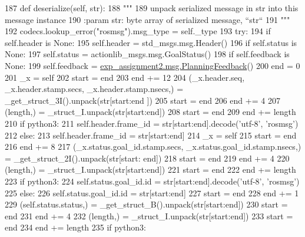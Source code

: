 \begin{DoxyCode}
187   \textcolor{keyword}{def }deserialize(self, str):
188     \textcolor{stringliteral}{"""}
189 \textcolor{stringliteral}{    unpack serialized message in str into this message instance}
190 \textcolor{stringliteral}{    :param str: byte array of serialized message, ``str``}
191 \textcolor{stringliteral}{    """}
192     codecs.lookup\_error(\textcolor{stringliteral}{"rosmsg"}).msg\_type = self.\_type
193     \textcolor{keywordflow}{try}:
194       \textcolor{keywordflow}{if} self.header \textcolor{keywordflow}{is} \textcolor{keywordtype}{None}:
195         self.header = std\_msgs.msg.Header()
196       \textcolor{keywordflow}{if} self.status \textcolor{keywordflow}{is} \textcolor{keywordtype}{None}:
197         self.status = actionlib\_msgs.msg.GoalStatus()
198       \textcolor{keywordflow}{if} self.feedback \textcolor{keywordflow}{is} \textcolor{keywordtype}{None}:
199         self.feedback = \hyperlink{classexp__assignment2_1_1msg_1_1__PlanningFeedback_1_1PlanningFeedback}{exp\_assignment2.msg.PlanningFeedback}()
200       end = 0
201       \_x = self
202       start = end
203       end += 12
204       (\_x.header.seq, \_x.header.stamp.secs, \_x.header.stamp.nsecs,) = \_get\_struct\_3I().unpack(str[start:end
      ])
205       start = end
206       end += 4
207       (length,) = \_struct\_I.unpack(str[start:end])
208       start = end
209       end += length
210       \textcolor{keywordflow}{if} python3:
211         self.header.frame\_id = str[start:end].decode(\textcolor{stringliteral}{'utf-8'}, \textcolor{stringliteral}{'rosmsg'})
212       \textcolor{keywordflow}{else}:
213         self.header.frame\_id = str[start:end]
214       \_x = self
215       start = end
216       end += 8
217       (\_x.status.goal\_id.stamp.secs, \_x.status.goal\_id.stamp.nsecs,) = \_get\_struct\_2I().unpack(str[start:
      end])
218       start = end
219       end += 4
220       (length,) = \_struct\_I.unpack(str[start:end])
221       start = end
222       end += length
223       \textcolor{keywordflow}{if} python3:
224         self.status.goal\_id.id = str[start:end].decode(\textcolor{stringliteral}{'utf-8'}, \textcolor{stringliteral}{'rosmsg'})
225       \textcolor{keywordflow}{else}:
226         self.status.goal\_id.id = str[start:end]
227       start = end
228       end += 1
229       (self.status.status,) = \_get\_struct\_B().unpack(str[start:end])
230       start = end
231       end += 4
232       (length,) = \_struct\_I.unpack(str[start:end])
233       start = end
234       end += length
235       \textcolor{keywordflow}{if} python3:

\end{DoxyCode}
